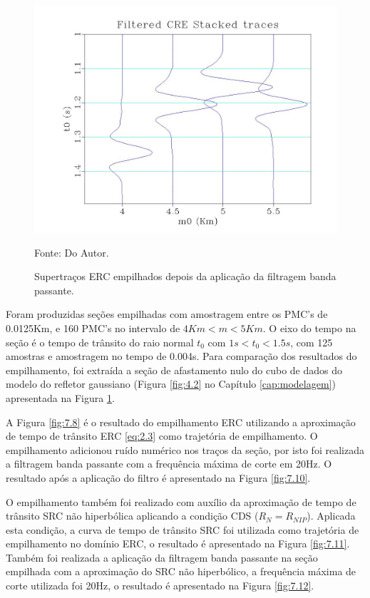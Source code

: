 \begin{figure}
\caption{Supertraços ERC empilhados depois da aplicação da filtragem banda passante.}
\begin{center}
\includegraphics[scale=0.4]{images/filtStackedTraces.jpeg}
\vspace{-0.3cm}
\end{center}
\begin{center}
 Fonte: Do Autor.
\end{center}
\label{fig:7.7}
\end{figure}


Foram produzidas seções empilhadas com 
amostragem entre os PMC's de 0.0125Km, e 160 PMC's no intervalo de $4Km<m<5Km$. O eixo do tempo na 
seção é o tempo de trânsito do raio normal $t_0$ com $1s<t_0<1.5s$, com 125 amostras e amostragem no tempo de 0.004s.
Para comparação dos resultados do empilhamento, foi extraída a seção de afastamento nulo do cubo de dados do modelo do
refletor gaussiano (Figura \ref{fig:4.2} no Capítulo \ref{cap:modelagem}) apresentada na Figura \ref{fig:7.7}.

A Figura \ref{fig:7.8} é o resultado do empilhamento ERC utilizando a aproximação de tempo de trânsito ERC \ref{eq:2.3}
como trajetória de empilhamento. O empilhamento adicionou ruído numérico nos traços da seção, por isto foi realizada a filtragem
banda passante com a frequência máxima de corte em 20Hz. O resultado após a aplicação do filtro é apresentado na Figura
\ref{fig:7.10}.

O empilhamento também foi realizado com auxílio da aproximação de tempo de trânsito SRC não hiperbólica aplicando a condição CDS
($R_N=R_{NIP}$). Aplicada esta condição, a curva de tempo de trânsito SRC foi utilizada como trajetória de empilhamento no domínio
ERC, o resultado é apresentado na Figura \ref{fig:7.11}. Também foi realizada a aplicação da filtragem banda passante na seção
empilhada com a aproximação do SRC não hiperbólico, a frequência máxima de corte utilizada foi 20Hz, o resultado é apresentado
na Figura \ref{fig:7.12}.

